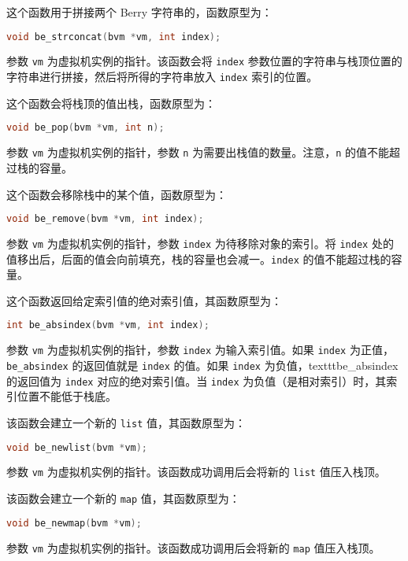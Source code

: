 这个函数用于拼接两个 Berry 字符串的，函数原型为：
\begin{lstlisting}[language=c, style=berry, numbers=none]
void be_strconcat(bvm *vm, int index);
\end{lstlisting}
参数 \texttt{vm} 为虚拟机实例的指针。该函数会将 \texttt{index} 参数位置的字符串与栈顶位置的字符串进行拼接，然后将所得的字符串放入 \texttt{index} 索引的位置。


这个函数会将栈顶的值出栈，函数原型为：
\begin{lstlisting}[language=c, style=berry, numbers=none]
void be_pop(bvm *vm, int n);
\end{lstlisting}
参数 \texttt{vm} 为虚拟机实例的指针，参数 \texttt{n} 为需要出栈值的数量。注意，\texttt{n} 的值不能超过栈的容量。


这个函数会移除栈中的某个值，函数原型为：
\begin{lstlisting}[language=c, style=berry, numbers=none]
void be_remove(bvm *vm, int index);
\end{lstlisting}
参数 \texttt{vm} 为虚拟机实例的指针，参数 \texttt{index} 为待移除对象的索引。将 \texttt{index} 处的值移出后，后面的值会向前填充，栈的容量也会减一。\texttt{index} 的值不能超过栈的容量。


这个函数返回给定索引值的绝对索引值，其函数原型为：
\begin{lstlisting}[language=c, style=berry, numbers=none]
int be_absindex(bvm *vm, int index);
\end{lstlisting}
参数 \texttt{vm} 为虚拟机实例的指针，参数 \texttt{index} 为输入索引值。如果 \texttt{index} 为正值，\texttt{be\_absindex} 的返回值就是 \texttt{index} 的值。如果 \texttt{index} 为负值，texttt{be\_absindex} 的返回值为 \texttt{index} 对应的绝对索引值。当 \texttt{index} 为负值（是相对索引）时，其索引位置不能低于栈底。


该函数会建立一个新的 \texttt{list} 值，其函数原型为：
\begin{lstlisting}[language=c, style=berry, numbers=none]
void be_newlist(bvm *vm);
\end{lstlisting}
参数 \texttt{vm} 为虚拟机实例的指针。该函数成功调用后会将新的 \texttt{list} 值压入栈顶。


该函数会建立一个新的 \texttt{map} 值，其函数原型为：
\begin{lstlisting}[language=c, style=berry, numbers=none]
void be_newmap(bvm *vm);
\end{lstlisting}
参数 \texttt{vm} 为虚拟机实例的指针。该函数成功调用后会将新的 \texttt{map} 值压入栈顶。

